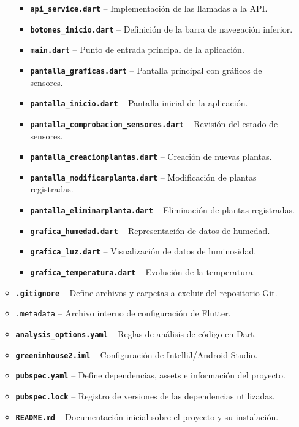 \begin{itemize}
\begin{itemize}
\begin{itemize}
    \item \textbf{\texttt{api\_service.dart}} – Implementación de las llamadas a la API.
    \item \textbf{\texttt{botones\_inicio.dart}} – Definición de la barra de navegación inferior.
    \item \textbf{\texttt{main.dart}} – Punto de entrada principal de la aplicación.

    \item \texttt{\textbf{pantalla\_graficas.dart}} – Pantalla principal con gráficos de sensores.
    \item \texttt\textbf{{pantalla\_inicio.dart}} – Pantalla inicial de la aplicación.
    \item \texttt{\textbf{pantalla\_comprobacion\_sensores.dart}} – Revisión del estado de sensores.
    \item \texttt{\textbf{pantalla\_creacionplantas.dart}} – Creación de nuevas plantas.
    \item \texttt{\textbf{pantalla\_modificarplanta.dart}} – Modificación de plantas registradas.
    \item \texttt{\textbf{pantalla\_eliminarplanta.dart}} – Eliminación de plantas registradas.

    \item \texttt{\textbf{grafica\_humedad.dart}} – Representación de datos de humedad.
    \item \texttt{\textbf{grafica\_luz.dart}} – Visualización de datos de luminosidad.
    \item \texttt{\textbf{grafica\_temperatura.dart}} – Evolución de la temperatura.
    \end{itemize}

    \item \texttt{\textbf{.gitignore}} – Define archivos y carpetas a excluir del repositorio Git.
    \item \texttt{.metadata} – Archivo interno de configuración de Flutter.
    \item \texttt{\textbf{analysis\_options.yaml}} – Reglas de análisis de código en Dart.
    \item \texttt{\textbf{greeninhouse2.iml}} – Configuración de IntelliJ/Android Studio.
    \item \texttt{\textbf{pubspec.yaml}} – Define dependencias, assets e información del proyecto.
    \item \texttt{\textbf{pubspec.lock}} – Registro de versiones de las dependencias utilizadas.
    \item \texttt{\textbf{README.md}} – Documentación inicial sobre el proyecto y su instalación.
    \end{itemize}
\end{itemize}

